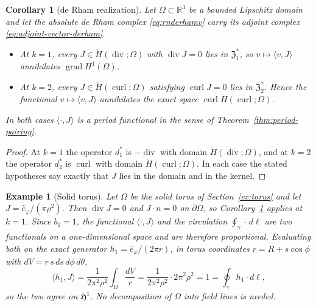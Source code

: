 \documentclass{article}
\newtheorem{corollary}{Corollary}[section]
\newtheorem{example}{Example}[section]
\DeclareMathOperator{\grad}{grad}
\DeclareMathOperator{\curl}{curl}
\DeclareMathOperator{\divergence}{div}
\newcommand{\f}[1]{\mathfrak{#1}}
\newcommand{\R} {\mathbb R}
\newcommand{\HH}{\mathfrak H}
\newcommand{\ip}[2]{\langle #1,#2\rangle}
\begin{document}
\begin{corollary}[de Rham realization]\label{cor:period-derham}
Let $\Omega\subset\R^{3}$ be a bounded Lipschitz domain and let the absolute de
Rham complex \eqref{eq:rnderhamv} carry its adjoint complex
\eqref{eq:adjoint-vector-derham}.
\begin{itemize}
\item At $k=1$, every $J\in\mathring H(\divergence;\Omega)$ with
$\divergence J=0$ lies in $\f Z^{*}_{1}$, so $v\mapsto\ip{v}{J}$ annihilates
$\grad H^{1}(\Omega)$.
\item At $k=2$, every $J\in\mathring H(\curl;\Omega)$ satisfying $\curl J=0$ lies in $\f Z^{*}_{2}$. Hence the functional $v\mapsto\ip{v}{J}$ annihilates the exact space $\curl H(\curl;\Omega)$.
\end{itemize}
In both cases $\ip{\cdot}{J}$ is a period functional in the sense of
Theorem~\ref{thm:period-pairing}.
\end{corollary}

\begin{proof}
At $k=1$ the operator $d^{*}_{1}$ is $-\divergence$ with domain
$\mathring H(\divergence;\Omega)$, and at $k=2$ the operator $d^{*}_{2}$ is
$\curl$ with domain $\mathring H(\curl;\Omega)$. In each case the stated
hypotheses say exactly that $J$ lies in the domain and in the kernel.
\end{proof}

\begin{example}[Solid torus]\label{ex:period-torus}
Let $\Omega$ be the solid torus of Section~\ref{ex:torus} and let
$J=\hat e_{\varphi}/(\pi\rho^{2})$. Then $\divergence J=0$ and $J\cdot n=0$ on
$\partial\Omega$, so Corollary~\ref{cor:period-derham} applies at $k=1$. Since
$b_1=1$, the functional $\ip{\cdot}{J}$ and the circulation
$\oint_{\gamma}\cdot\,d\ell$ are two functionals on a one-dimensional space and
are therefore proportional. Evaluating both on the exact generator
$h_1=\hat e_{\varphi}/(2\pi r)$, in torus coordinates $r=R+s\cos\phi$ with
$dV=r\,s\,ds\,d\phi\,d\theta$,
\[
 \ip{h_1}{J}=\frac{1}{2\pi^{2}\rho^{2}}\int_{\Omega}\frac{dV}{r}
 =\frac{1}{2\pi^{2}\rho^{2}}\cdot 2\pi^{2}\rho^{2}=1
 =\oint_{\gamma}h_1\cdot d\ell ,
\]
so the two agree on $\HH^{1}$. No decomposition of $\Omega$ into field lines is
needed.
\end{example}
\end{document}
